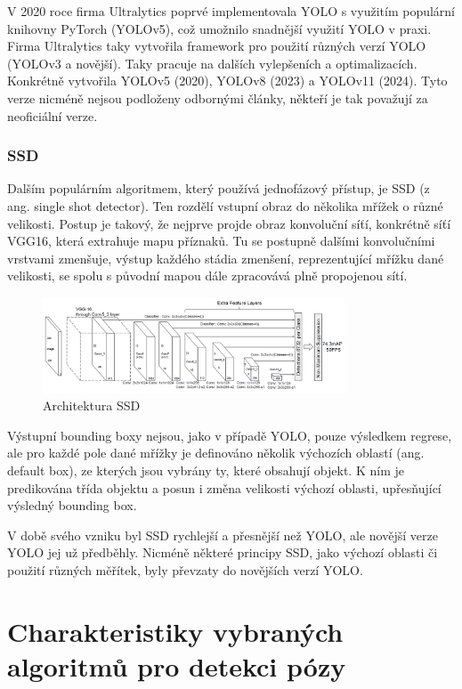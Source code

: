 V 2020 roce firma Ultralytics poprvé implementovala YOLO s využitím populární
knihovny PyTorch (YOLOv5), což umožnilo snadnější využití YOLO v praxi. Firma
Ultralytics taky vytvořila framework pro použití různých verzí YOLO (YOLOv3 a
novější). Taky pracuje na dalších vylepšeních a optimalizacích. Konkrétně
vytvořila YOLOv5 (2020), YOLOv8 (2023) a YOLOv11 (2024). Tyto verze nicméně
nejsou podloženy odbornými články, někteří je tak považují za neoficiální
verze.

\subsubsection{SSD}
Dalším populárním algoritmem, který používá jednofázový přístup, je SSD (z ang.
single shot detector). \cite{szegedy:ssd} Ten rozdělí vstupní obraz do několika
mřížek o různé velikosti. Postup je takový, že nejprve projde obraz konvoluční
síťí, konkrétně síťí VGG16, která extrahuje mapu příznaků. Tu se postupně
dalšími konvolučními vrstvami zmenšuje, výstup každého stádia zmenšení,
reprezentující mřížku dané velikosti, se spolu s původní mapou dále zpracovává
plně propojenou sítí.
\begin{figure}[]
    \centering
    \includegraphics[width=0.8\textwidth]{Figures/ssd.png}
    \caption{Architektura SSD \cite{szegedy:ssd}}
    \label{fig:ssd}
\end{figure}

Výstupní bounding boxy nejsou, jako v případě YOLO, pouze výsledkem regrese,
ale pro každé pole dané mřížky je definováno několik výchozích oblastí (ang.
default box), ze kterých jsou vybrány ty, které obsahují objekt. K ním je
predikována třída objektu a posun i změna velikosti výchozí oblasti,
upřesňující výsledný bounding box.

V době svého vzniku byl SSD rychlejší a přesnější než YOLO, ale novější verze
YOLO jej už předběhly. Nicméně některé principy SSD, jako výchozí oblasti či
použití různých měřítek, byly převzaty do novějších verzí YOLO.

\section{Charakteristiky vybraných algoritmů pro detekci pózy}


